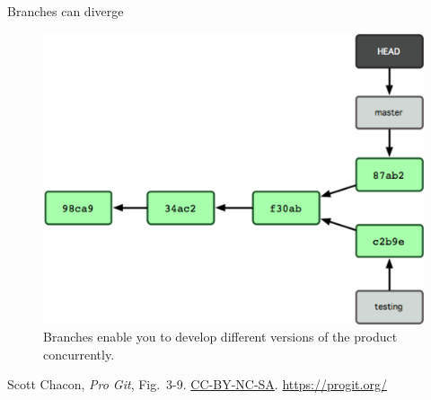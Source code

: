 \begin{frame}{Branches can diverge}
  \begin{figure}
    \includegraphics[scale=0.8]{18333fig0309-tn.png}
    \\ Branches enable you to develop different versions of the product concurrently.
  \end{figure}
  \footnotesize{Scott Chacon,
    \emph{Pro Git},
    Fig.~3-9.
    \href{https://creativecommons.org/licenses/by-nc-sa/3.0/legalcode}{CC-BY-NC-SA}.
    \href{https://progit.org/}{https://progit.org/}}
\end{frame}

